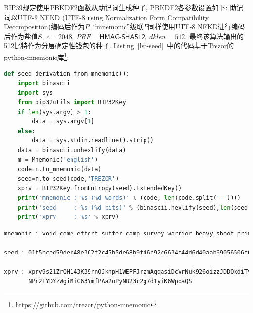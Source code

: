 
BIP39规定使用\textsf{PBKDF2}函数从助记词生成种子, \textsf{PBKDF2}各参数设置如下:
助记词以UTF-8 NFKD (UTF-8 using Normalization Form Compatibility Decomposition)编码后作为$P$,
``mnemonic''级联$P$同样使用UTF-8 NFKD进行编码后作为盐值$S$,
$c=2048,\ PRF=\textsf{HMAC-SHA512},\ dklen=512$.
最终该算法输出的512比特作为分层确定性钱包的种子.
Listing~\ref{lst-seed}~中的代码基于Trezor的python-mnemonic库\footnote{
\url{https://github.com/trezor/python-mnemonic}}:

\begin{lstlisting}[language=python, caption=基于助记词句子的种子派生, label=lst-seed]
def seed_derivation_from_mnemonic():
    import binascii
    import sys
    from bip32utils import BIP32Key
    if len(sys.argv) > 1:
        data = sys.argv[1]
    else:
        data = sys.stdin.readline().strip()
    data = binascii.unhexlify(data)
    m = Mnemonic('english')
    code=m.to_mnemonic(data)
    seed=m.to_seed(code,'TREZOR')
    xprv = BIP32Key.fromEntropy(seed).ExtendedKey()
    print('mnemonic : %s (%d words)' % (code, len(code.split(' '))))
    print('seed     : %s (%d bits)' % (binascii.hexlify(seed),len(seed) * 4))
    print('xprv     : %s' % xprv)
\end{lstlisting}

\begin{lstlisting}[language=bash, caption = Listing~\ref{lst-seed}~的执行结果示例]
mnemonic : void come effort suffer camp survey warrior heavy shoot primary clutch crush open amazing screen patrol group space point ten exist slush involve unfold (24 words) 

seed : 01f5bced59dec48e362f2c45b5de68b9fd6c92c6634f44d6d40aab69056506f0e35524a    518034ddc1192e1dacd32c1ed3eaa3c3b131c88ed8e7e54c49a5d0998 (256 bits) 

xprv : xprv9s21ZrQH143K39rnQJknpH1WEPFJrzmAqqasiDcVrNuk926oizzJDDQkdiTv
       NPr2FYDYzWgiMiC63YmfPAa2oPyNB23r2g7d1yiK6WpqaQS
\end{lstlisting}